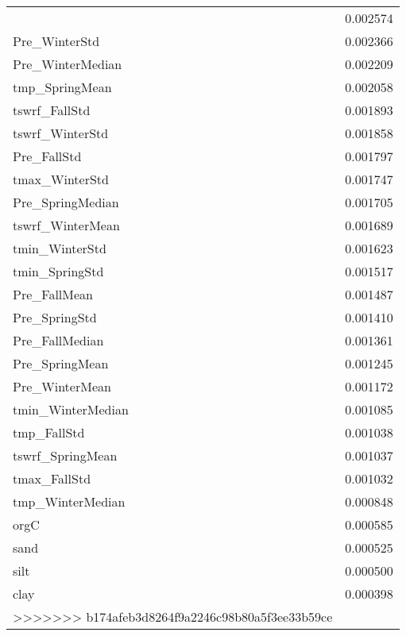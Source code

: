 \begin{tabular}{lr}
\begin{tabular}{rrrrr}
tmp_WinterStd & 0.002574 \\
Pre_WinterStd & 0.002366 \\
Pre_WinterMedian & 0.002209 \\
tmp_SpringMean & 0.002058 \\
tswrf_FallStd & 0.001893 \\
tswrf_WinterStd & 0.001858 \\
Pre_FallStd & 0.001797 \\
tmax_WinterStd & 0.001747 \\
Pre_SpringMedian & 0.001705 \\
tswrf_WinterMean & 0.001689 \\
tmin_WinterStd & 0.001623 \\
tmin_SpringStd & 0.001517 \\
Pre_FallMean & 0.001487 \\
Pre_SpringStd & 0.001410 \\
Pre_FallMedian & 0.001361 \\
Pre_SpringMean & 0.001245 \\
Pre_WinterMean & 0.001172 \\
tmin_WinterMedian & 0.001085 \\
tmp_FallStd & 0.001038 \\
tswrf_SpringMean & 0.001037 \\
tmax_FallStd & 0.001032 \\
tmp_WinterMedian & 0.000848 \\
orgC & 0.000585 \\
sand & 0.000525 \\
silt & 0.000500 \\
clay & 0.000398 \\
>>>>>>> b174afeb3d8264f9a2246c98b80a5f3ee33b59ce
\bottomrule
\end{tabular}
